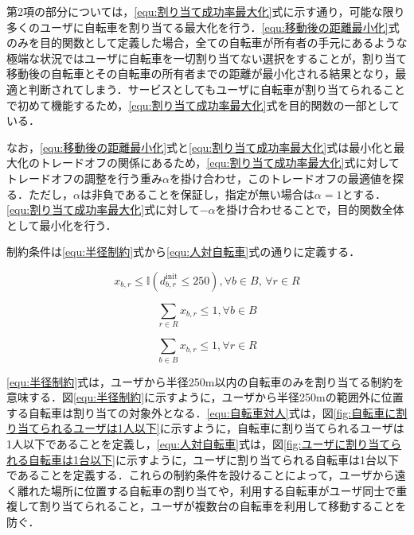           \par 第2項の部分については，\ref{equ:割り当て成功率最大化}式に示す通り，可能な限り多くのユーザに自転車を割り当てる最大化を行う．\ref{equ:移動後の距離最小化}式のみを目的関数として定義した場合，全ての自転車が所有者の手元にあるような極端な状況ではユーザに自転車を一切割り当てない選択をすることが，割り当て移動後の自転車とその自転車の所有者までの距離が最小化される結果となり，最適と判断されてしまう．サービスとしてもユーザに自転車が割り当てられることで初めて機能するため，\ref{equ:割り当て成功率最大化}式を目的関数の一部としている．
          
          \par なお，\ref{equ:移動後の距離最小化}式と\ref{equ:割り当て成功率最大化}式は最小化と最大化のトレードオフの関係にあるため，\ref{equ:割り当て成功率最大化}式に対してトレードオフの調整を行う重み$\alpha$を掛け合わせ，このトレードオフの最適値を探る．ただし，$\alpha$は非負であることを保証し，指定が無い場合は$\alpha=1$とする．\ref{equ:割り当て成功率最大化}式に対して$-\alpha$を掛け合わせることで，目的関数全体として最小化を行う．
          
          \par 制約条件は\ref{equ:半径制約}式から\ref{equ:人対自転車}式の通りに定義する．
          
          \begin{equation}\label{equ:半径制約}
            x_{b, r} \leq \mathbb{I}(d^{\text{init}}_{b, r} \leq 250), \forall b \in B, \, \forall r \in R
          \end{equation}
          
          \begin{equation}\label{equ:自転車対人}
            \sum_{r \in R}x_{b,r} \leq 1, \forall b \in B
          \end{equation}
          
          \begin{equation}\label{equ:人対自転車}
            \sum_{b \in B}x_{b,r} \leq 1, \forall r \in R
          \end{equation}
          
          \par \ref{equ:半径制約}式は，ユーザから半径250m以内の自転車のみを割り当てる制約を意味する．図\ref{equ:半径制約}に示すように，ユーザから半径250mの範囲外に位置する自転車は割り当ての対象外となる．\ref{equ:自転車対人}式は，図\ref{fig:自転車に割り当てられるユーザは1人以下}に示すように，自転車に割り当てられるユーザは1人以下であることを定義し，\ref{equ:人対自転車}式は，図\ref{fig:ユーザに割り当てられる自転車は1台以下}に示すように，ユーザに割り当てられる自転車は1台以下であることを定義する．これらの制約条件を設けることによって，ユーザから遠く離れた場所に位置する自転車の割り当てや，利用する自転車がユーザ同士で重複して割り当てられること，ユーザが複数台の自転車を利用して移動することを防ぐ．
          
